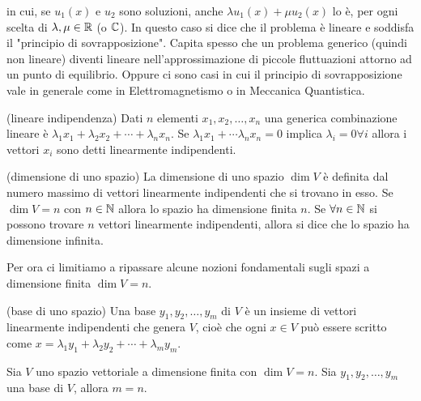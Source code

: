in cui, se $u_1(x)$ e $u_2$ sono soluzioni, anche $\lambda u_1(x) + \mu u_2(x)$ lo è, per ogni scelta di $\lambda, \mu \in \mathbb R$ (o $\mathbb C$). In questo caso si dice che il problema è lineare e soddisfa il "principio di sovrapposizione". Capita spesso che un problema generico (quindi non lineare) diventi lineare nell'approssimazione di piccole fluttuazioni attorno ad un punto di equilibrio. Oppure ci sono casi in cui il principio di sovrapposizione vale in generale come in Elettromagnetismo o in Meccanica Quantistica.

\begin{definition}{(lineare indipendenza)}
Dati $n$ elementi $x_1, x_2, \ldots, x_n$ una generica combinazione lineare è $\lambda_1 x_1 + \lambda_2 x_2 + \cdots + \lambda_n x_n$. Se $\lambda_1 x_1 + \cdots \lambda_n x_n = 0$ implica $\lambda_i = 0 \forall i$ allora i vettori $x_i$ sono detti linearmente indipendenti. 
\end{definition}

\begin{definition}{(dimensione di uno spazio)}
La dimensione di uno spazio $\dim{V}$ è definita dal numero massimo di vettori linearmente indipendenti che si trovano in esso. Se $\dim{V} = n$ con $n \in \mathbb N$ allora lo spazio ha dimensione finita $n$. Se $\forall n \in \mathbb N$ si possono trovare $n$ vettori linearmente indipendenti, allora si dice che lo spazio ha dimensione infinita.   
\end{definition}

Per ora ci limitiamo a ripassare alcune nozioni fondamentali sugli spazi a dimensione finita $\dim{V} = n$.

\begin{definition}{(base di uno spazio)}
Una base $y_1, y_2, \ldots , y_m$ di $V$ è un insieme di vettori linearmente indipendenti che genera $V$, cioè che ogni $x \in V$ può essere scritto come $x = \lambda_1 y_1 + \lambda_2 y_2 + \cdots + \lambda_m y_m$.
\end{definition}

\begin{theorem}
Sia $V$ uno spazio vettoriale a dimensione finita con $\dim{V} = n$. Sia $y_1, y_2, \ldots , y_m$ una base di $V$, allora $m=n$.
\end{theorem}


